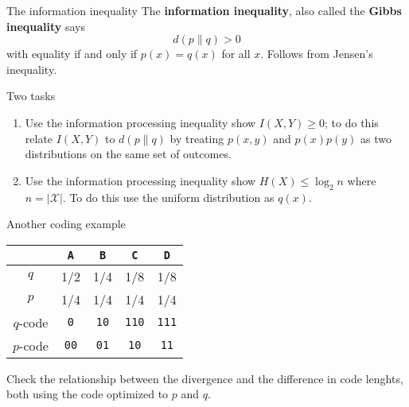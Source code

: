 \documentclass{beamer}
\newcommand{\crish}{\color{reddish}}
\newcommand{\cbla}{\color{black}}
\newcommand{\letter}[1]{\color{blue}\texttt{#1}\color{black}}
\newcommand{\binary}[1]{\color{red}\texttt{#1}\color{black}}
\begin{document}
\begin{frame}{The information inequality}
  The \textbf{information inequality}, also called the \textbf{Gibbs inequality} says
  \crish
  $$d(p\|q)>0$$
  \cbla
  with equality if and only if \crish$p(x)=q(x)$\cbla{} for all \crish$x$\cbla{}. Follows from Jensen's inequality.
\end{frame}

\begin{frame}{Two tasks}
  \begin{enumerate}
    \item Use the information processing inequality show
      \crish$I(X,Y)\ge 0$\cbla; to do this relate
      \crish$I(X,Y)$\cbla{} to \crish$d(p\|q)$\cbla{} by treating
      \crish$p(x,y)$\cbla{} and \crish$p(x)p(y)$\cbla{} as two
      distributions on the same set of outcomes.
    \item Use the information processing inequality show
      \crish$H(X)\le \log_2{n}$\cbla{} where
      \crish$n=|\mathcal{X}|$\cbla. To do this use the uniform
      distribution as $q(x)$.
  \end{enumerate}
\end{frame}


\begin{frame}{Another coding example}

\begin{center}
\begin{tabular}{c|cccc}
&\letter{A}&\letter{B}&\letter{C}&\letter{D}\\
\hline
$q$&1/2&1/4&1/8&1/8\\
$p$&1/4&1/4&1/4&1/4\\
\hline
$q$-code&\binary{0}&\binary{10}&\binary{110}&\binary{111}\\
$p$-code&\binary{00}&\binary{01}&\binary{10}&\binary{11}
\end{tabular}
\end{center}
\cbla Check the relationship between the divergence and the
difference in code lenghts, both using the code optimized to
\crish$p$\cbla{} and \crish$q$\cbla{}.  \cbla
\end{frame}
\end{document}
